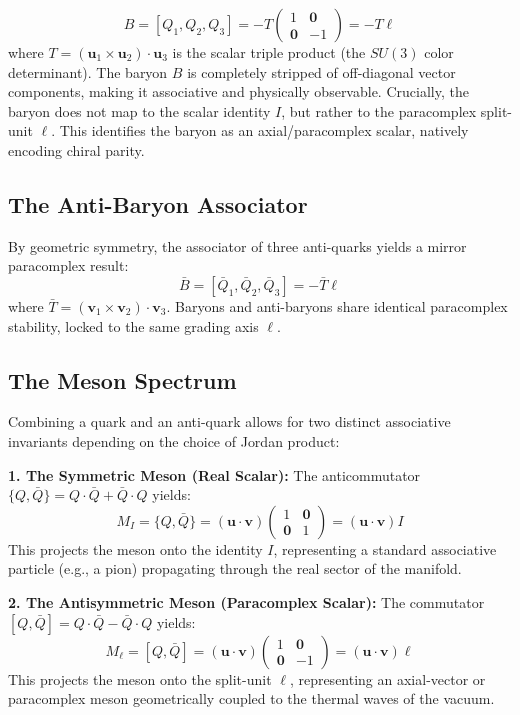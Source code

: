 \documentclass[11pt,a4paper]{article}
\begin{document}
\begin{equation}
B = [Q_1, Q_2, Q_3] = -T \begin{pmatrix} 1 & \mathbf{0} \\ \mathbf{0} & -1 \end{pmatrix} = -T \ell
\end{equation}
where $T = (\mathbf{u}_1 \times \mathbf{u}_2) \cdot \mathbf{u}_3$ is the scalar triple product (the $SU(3)$ color determinant). The baryon $B$ is completely stripped of off-diagonal vector components, making it associative and physically observable. Crucially, the baryon does not map to the scalar identity $I$, but rather to the paracomplex split-unit $\ell$. This identifies the baryon as an axial/paracomplex scalar, natively encoding chiral parity.

\subsection{The Anti-Baryon Associator}
By geometric symmetry, the associator of three anti-quarks yields a mirror paracomplex result:
\begin{equation}
\bar{B} = [\bar{Q}_1, \bar{Q}_2, \bar{Q}_3] = -\bar{T} \ell
\end{equation}
where $\bar{T} = (\mathbf{v}_1 \times \mathbf{v}_2) \cdot \mathbf{v}_3$. Baryons and anti-baryons share identical paracomplex stability, locked to the same grading axis $\ell$.

\subsection{The Meson Spectrum}
Combining a quark and an anti-quark allows for two distinct associative invariants depending on the choice of Jordan product:

\textbf{1. The Symmetric Meson (Real Scalar):}
The anticommutator $\{Q, \bar{Q}\} = Q \cdot \bar{Q} + \bar{Q} \cdot Q$ yields:
\begin{equation}
M_I = \{Q, \bar{Q}\} = (\mathbf{u} \cdot \mathbf{v}) \begin{pmatrix} 1 & \mathbf{0} \\ \mathbf{0} & 1 \end{pmatrix} = (\mathbf{u} \cdot \mathbf{v}) I
\end{equation}
This projects the meson onto the identity $I$, representing a standard associative particle (e.g., a pion) propagating through the real sector of the manifold.

\textbf{2. The Antisymmetric Meson (Paracomplex Scalar):}
The commutator $[Q, \bar{Q}] = Q \cdot \bar{Q} - \bar{Q} \cdot Q$ yields:
\begin{equation}
M_\ell = [Q, \bar{Q}] = (\mathbf{u} \cdot \mathbf{v}) \begin{pmatrix} 1 & \mathbf{0} \\ \mathbf{0} & -1 \end{pmatrix} = (\mathbf{u} \cdot \mathbf{v}) \ell
\end{equation}
This projects the meson onto the split-unit $\ell$, representing an axial-vector or paracomplex meson geometrically coupled to the thermal waves of the vacuum.
\end{document}
